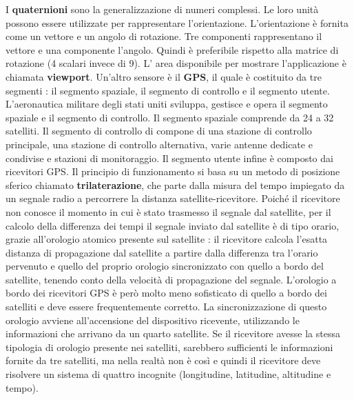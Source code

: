 \documentclass[12pt]{report}
\begin{document}
I \textbf{quaternioni} sono la generalizzazione di numeri complessi. Le loro unità possono essere utilizzate per rappresentare l'orientazione. L'orientazione è fornita come un vettore e un angolo di rotazione. Tre componenti rappresentano il vettore e una componente l'angolo. Quindi è preferibile rispetto alla matrice di rotazione (4 scalari invece di 9). L' area disponibile per mostrare l'applicazione è chiamata \textbf{viewport}. Un'altro sensore è il \textbf{GPS}, il quale è costituito da tre segmenti : il segmento spaziale, il segmento di controllo e il segmento utente. L'aeronautica militare degli stati uniti sviluppa, gestisce e opera il segmento spaziale e il segmento di controllo. Il segmento spaziale comprende da 24 a 32 satelliti. Il segmento di controllo di compone di una stazione di controllo principale, una stazione di controllo alternativa, varie antenne dedicate e condivise e stazioni di monitoraggio. Il segmento utente infine è composto dai ricevitori GPS. Il principio di funzionamento si basa su un metodo di posizione sferico chiamato \textbf{trilaterazione}, che parte dalla misura del tempo impiegato da un segnale radio a percorrere la distanza satellite-ricevitore. Poiché il ricevitore non conosce il momento in cui è stato trasmesso il segnale dal satellite, per il calcolo della differenza dei tempi il segnale inviato dal satellite è di tipo orario, grazie all'orologio atomico presente sul satellite : il ricevitore calcola l'esatta distanza di propagazione dal satellite a partire dalla differenza tra l'orario pervenuto e quello del proprio orologio sincronizzato con quello a bordo del satellite, tenendo conto della velocità di propagazione del segnale. L'orologio a bordo dei ricevitori GPS è però molto meno sofisticato di quello a bordo dei satelliti e deve essere frequentemente corretto. La sincronizzazione di questo orologio avviene all'accensione del dispositivo ricevente, utilizzando le informazioni che arrivano da un quarto satellite. Se il ricevitore avesse la stessa tipologia di orologio presente nei satelliti, sarebbero sufficienti le informazioni fornite da tre satelliti, ma nella realtà non è così e quindi il ricevitore deve risolvere un sistema di quattro incognite (longitudine, latitudine, altitudine e tempo).
\end{document}
